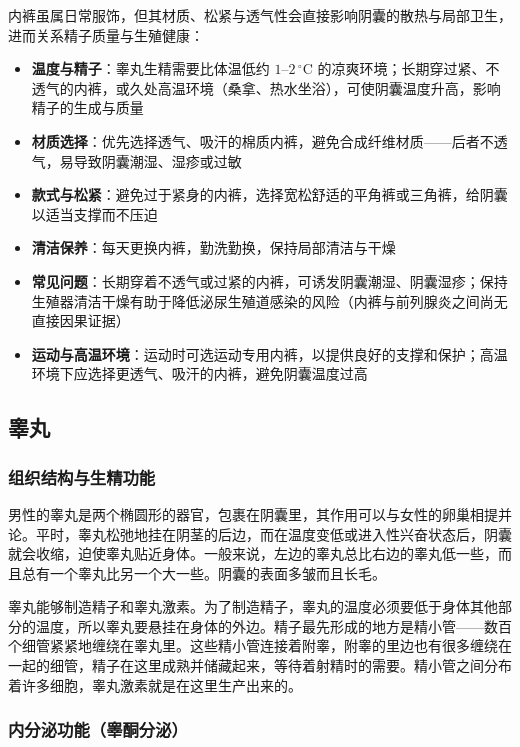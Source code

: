 \documentclass[12pt,a4paper,twoside]{ctexbook}
\begin{document}
内裤虽属日常服饰，但其材质、松紧与透气性会直接影响阴囊的散热与局部卫生，进而关系精子质量与生殖健康：

\begin{itemize}
    \item \textbf{温度与精子}：睾丸生精需要比体温低约 $1$--$2\,^{\circ}\mathrm{C}$ 的凉爽环境；长期穿过紧、不透气的内裤，或久处高温环境（桑拿、热水坐浴），可使阴囊温度升高，影响精子的生成与质量
    \item \textbf{材质选择}：优先选择透气、吸汗的棉质内裤，避免合成纤维材质——后者不透气，易导致阴囊潮湿、湿疹或过敏
    \item \textbf{款式与松紧}：避免过于紧身的内裤，选择宽松舒适的平角裤或三角裤，给阴囊以适当支撑而不压迫
    \item \textbf{清洁保养}：每天更换内裤，勤洗勤换，保持局部清洁与干燥
    \item \textbf{常见问题}：长期穿着不透气或过紧的内裤，可诱发阴囊潮湿、阴囊湿疹；保持生殖器清洁干燥有助于降低泌尿生殖道感染的风险（内裤与前列腺炎之间尚无直接因果证据）
    \item \textbf{运动与高温环境}：运动时可选运动专用内裤，以提供良好的支撑和保护；高温环境下应选择更透气、吸汗的内裤，避免阴囊温度过高
\end{itemize}

\subsection{睾丸}
\subsubsection{组织结构与生精功能}

男性的睾丸是两个椭圆形的器官，包裹在阴囊里，其作用可以与女性的卵巢相提并论。平时，睾丸松弛地挂在阴茎的后边，而在温度变低或进入性兴奋状态后，阴囊就会收缩，迫使睾丸贴近身体。一般来说，左边的睾丸总比右边的睾丸低一些，而且总有一个睾丸比另一个大一些。阴囊的表面多皱而且长毛。

睾丸能够制造精子和睾丸激素。为了制造精子，睾丸的温度必须要低于身体其他部分的温度，所以睾丸要悬挂在身体的外边。精子最先形成的地方是精小管——数百个细管紧紧地缠绕在睾丸里。这些精小管连接着附睾，附睾的里边也有很多缠绕在一起的细管，精子在这里成熟并储藏起来，等待着射精时的需要。精小管之间分布着许多细胞，睾丸激素就是在这里生产出来的。

\subsubsection{内分泌功能（睾酮分泌）}
\end{document}
